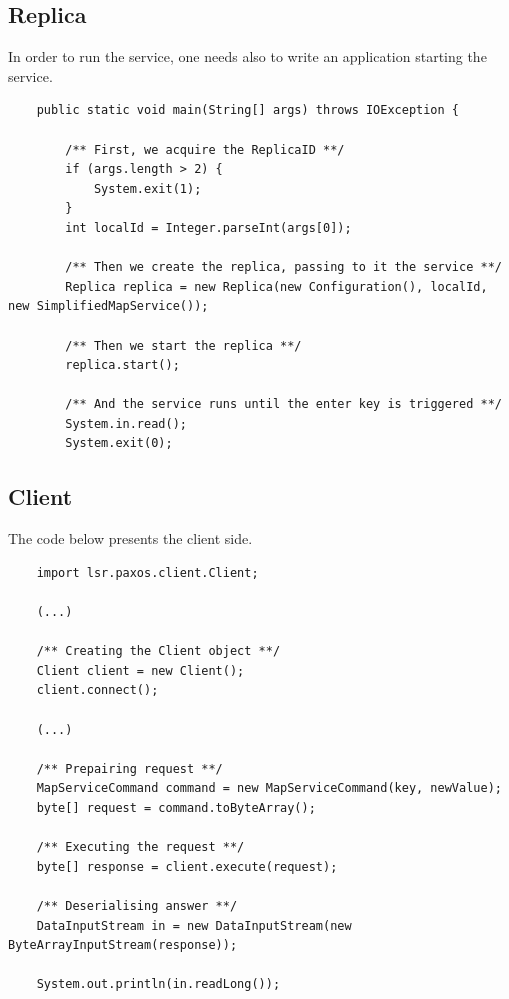 \subsection{Replica}
\label{example:replica}
In order to run the service, one needs also to write an application starting the service.

\begin{lstlisting}
    public static void main(String[] args) throws IOException {

        /** First, we acquire the ReplicaID **/
        if (args.length > 2) {
            System.exit(1);
        }
        int localId = Integer.parseInt(args[0]);

        /** Then we create the replica, passing to it the service **/
        Replica replica = new Replica(new Configuration(), localId, new SimplifiedMapService());

        /** Then we start the replica **/
        replica.start();

        /** And the service runs until the enter key is triggered **/
        System.in.read();
        System.exit(0);
\end{lstlisting}


\subsection{Client}
\label{example:client}
The code below presents the client side.

\begin{lstlisting}
    import lsr.paxos.client.Client;
    
    (...)
    
    /** Creating the Client object **/
    Client client = new Client();
    client.connect();
    
    (...)
    
    /** Prepairing request **/
    MapServiceCommand command = new MapServiceCommand(key, newValue);
    byte[] request = command.toByteArray();
    
    /** Executing the request **/
    byte[] response = client.execute(request);
    
    /** Deserialising answer **/
    DataInputStream in = new DataInputStream(new ByteArrayInputStream(response));
    
    System.out.println(in.readLong());
\end{lstlisting}


